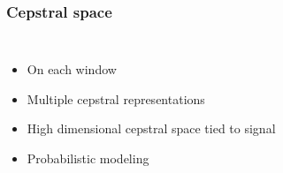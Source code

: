 \documentclass[11pt,english]{beamer}
\begin{document}
\begin{frame}
  \frametitle{Cepstral space}
  \begin{columns}
    \begin{itemize}
    \item On each window
    \item Multiple cepstral representations
    \item High dimensional cepstral space tied to signal
    \item Probabilistic modeling
    \end{itemize}
  \end{columns}
\end{frame}
\end{document}
